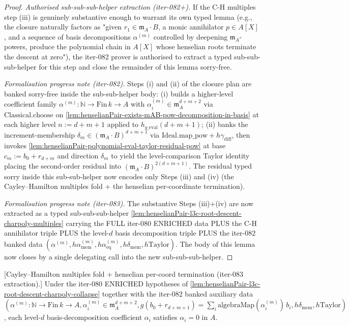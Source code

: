 \begin{proof}
\textit{Authorised sub-sub-sub-helper extraction (iter-082+).}
If the C-H multiples step (iii) is genuinely substantive enough
to warrant its own typed lemma (e.g., the closure naturally
factors as "given $r_1 \in \mathfrak m_A \cdot B$, a monic
annihilator $p \in A[X]$, and a sequence of basis decompositions
$\alpha^{(m)}$ controlled by deepening $\mathfrak m_A$-powers,
produce the polynomial chain in $A[X]$ whose henselian roots
terminate the descent at zero"), the iter-082 prover is
authorised to extract a typed sub-sub-sub-helper for this step
and close the remainder of this lemma sorry-free.

\textit{Formalisation progress note (iter-082).} Steps (i) and
(ii) of the closure plan are banked sorry-free inside the
sub-sub-helper body: (i) builds a higher-level coefficient family
$\alpha^{(m)} : \mathbb N \to \mathrm{Fin}\,k \to A$ with
$\alpha^{(m)}_i \in \mathfrak m_A^{d+m+2}$ via
$\mathrm{Classical.choose}$ on
\cref{lem:henselianPair-exists-mAB-pow-decomposition-in-basis}
at each higher level $n := d + m + 1$ applied to
$h_{g\_\mathrm{eval}}(d+m+1)$; (ii) banks the increment-membership
$\delta_m \in (\mathfrak m_A \cdot B)^{d+m+1}$ via
$\mathrm{Ideal.map\_pow} + h\gamma_{\mathrm{diff}}$, then invokes
\cref{lem:henselianPair-polynomial-eval-taylor-residual-pow}
at base $c_m := b_0 + r_{d+m}$ and direction $\delta_m$ to yield
the level-comparison Taylor identity placing the second-order
residual into $(\mathfrak m_A \cdot B)^{2(d+m+1)}$. The residual
typed sorry inside this sub-sub-helper now encodes only
Steps (iii) and (iv) (the Cayley--Hamilton multiples fold + the
henselian per-coordinate termination).

\textit{Formalisation progress note (iter-083).} The substantive
Steps (iii)+(iv) are now extracted as a typed sub-sub-sub-helper
\cref{lem:henselianPair-l3c-root-descent-charpoly-multiples}
carrying the FULL iter-080 ENRICHED data PLUS the C-H annihilator
triple PLUS the level-$d$ basis decomposition triple PLUS the
iter-082 banked data $(\alpha^{(m)}, h\alpha^{(m)}_{\mathrm{mem}},
h\alpha^{(m)}_{\mathrm{eq}}, h\delta_{\mathrm{mem}},
h\mathrm{Taylor})$. The body of this lemma now closes by a single
delegating call into the new sub-sub-sub-helper.
\end{proof}

\begin{lemma}
\label{lem:henselianPair-l3c-root-descent-charpoly-multiples}
\leanok
{}
[Cayley--Hamilton multiples fold + henselian per-coord termination
(iter-083 extraction).]
Under the iter-080 ENRICHED hypotheses of
\cref{lem:henselianPair-l3c-root-descent-charpoly-collapse}
together with the iter-082 banked auxiliary data
$(\alpha^{(m)} : \mathbb N \to \mathrm{Fin}\,k \to A,
 \alpha^{(m)}_i \in \mathfrak m_A^{d+m+2},
 g(b_0 + r_{d+m+1}) = \sum_i \mathrm{algebraMap}(\alpha^{(m)}_i)\,b_i,
 h\delta_{\mathrm{mem}},
 h\mathrm{Taylor})$,
each level-$d$ basis-decomposition coefficient $\alpha_i$ satisfies
$\alpha_i = 0$ in $A$.
\end{lemma}

